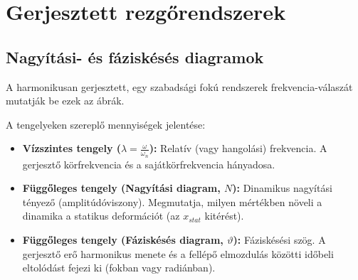 \newpage
\section{Gerjesztett rezgőrendszerek}

\subsection*{Nagyítási- és fáziskésés diagramok}
A harmonikusan gerjesztett, egy szabadsági fokú rendszerek frekvencia-válaszát mutatják be ezek az ábrák.

A tengelyeken szereplő mennyiségek jelentése:
\begin{itemize}
    \item \textbf{Vízszintes tengely ($\lambda = \frac{\omega}{\omega_n}$):} Relatív (vagy hangolási) frekvencia. A gerjesztő körfrekvencia és a sajátkörfrekvencia hányadosa.
    \item \textbf{Függőleges tengely (Nagyítási diagram, $N$):} Dinamikus nagyítási tényező (amplitúdóviszony). Megmutatja, milyen mértékben növeli a dinamika a statikus deformációt (az $x_{stat}$ kitérést).
    \item \textbf{Függőleges tengely (Fáziskésés diagram, $\vartheta$):} Fáziskésési szög. A gerjesztő erő harmonikus menete és a fellépő elmozdulás közötti időbeli eltolódást fejezi ki (fokban vagy radiánban).
\end{itemize}

